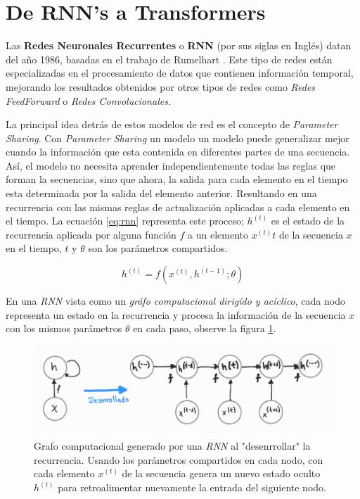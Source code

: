 \section{De RNN's a Transformers}

Las \textbf{Redes Neuronales Recurrentes} o \textbf{RNN} (por sus siglas en Inglés) datan del año
1986, basadas en el trabajo de Rumelhart \cite{Rumelhart}. Este tipo de redes están especializadas
en el procesamiento de datos que contienen información temporal, mejorando los resultados obtenidos
por otros tipos de redes como \textit{Redes FeedForward} o \textit{Redes Convolucionales}.

La principal idea detrás de estos modelos de red es el concepto de \textit{Parameter Sharing}.
Con \textit{Parameter Sharing} un modelo un modelo puede generalizar mejor cuando la información
que esta contenida en diferentes partes de una secuencia. Así, el modelo no necesita aprender
independientemente todas las reglas que forman la secuencias, sino que ahora, la salida para cada
elemento en el tiempo esta determinada por la salida del elemento anterior. Resultando en una
recurrencia con las mismas reglas de actualización aplicadas a cada elemento en el tiempo.
La ecuación \ref{eq:rnn} representa este proceso; $h^{(t)}$ es el estado de la recurrencia aplicada
por alguna función $f$ a un elemento $x^{(t)}t$ de la secuencia $x$ en el tiempo, $t$ y $\theta$ son
los parámetros compartidos.

\begin{equation}
    h^{(t)} = f(x^{(t)}, h^{(t-1)}; \theta)
    \label{eq:rnnh}
\end{equation}

En una \textit{RNN} vista como un \textit{gráfo computacional dirigído y acíclico}, cada nodo
representa un estado en la recurrencia y procesa la información de la secuencia $x$ con los mismos
parámetros $\theta$ en cada paso, observe la figura \ref{fig:rnn_cg}.

\begin{figure}[h!]
\centering
\includegraphics[width=.8\textwidth]{Chapters/1. Transformer/Figures/rnn/rnn_cgraph.png}
\caption[RNN - Grafo Computacional]{Grafo computacional generado por una \textit{RNN} al "desenrrollar" la
recurrencia. Usando los parámetros compartidos en cada nodo, con cada elemento $x^{(t)}$ de la
secuencia genera un nuevo estado oculto $h^{(t)}$ para retroalimentar nuevamente la entrada del
siguiente nodo.}
\label{fig:rnn_cg}
\end{figure}

